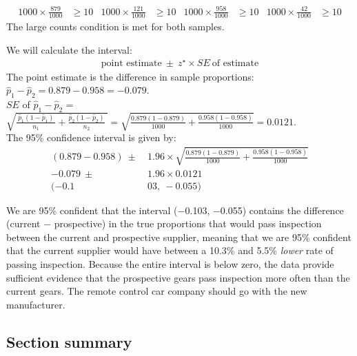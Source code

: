 \begin{examplewrap}
\begin{nexample}
\begin{description}
\begin{align*}
1000 \times \frac{879}{1000} &\ge 10
	&1000 \times \frac{121}{1000} &\ge 10
	&1000 \times \frac{958}{1000} &\ge 10
	&1000 \times \frac{42}{1000} &\ge 10
\end{align*}
The large counts condition is met for both samples.
\item[\inferencestep{Calculate}]  We will calculate the interval: 
\begin{align*}
\text{point estimate}\ \pm\ z^{\star} \times SE\ \text{of estimate}
\end{align*}
The point estimate is the difference in sample proportions: $\hat{p}_1-\hat{p}_2 = 0.879 - 0.958 = -0.079$.  \\

$SE$ of $\hat{p}_1-\hat{p}_2$ = $\sqrt{\frac{\ \hat{p}_1(1-\hat{p}_1)\ }{n_1}+ \frac{\hat{p}_2(1-\hat{p}_2)}{n_2}\ } = \sqrt{\frac{0.879(1-0.879)}{1000} +\frac{0.958(1-0.958)}{1000}}= 0.0121$.  \\

The 95\% confidence interval is given by:
\begin{align*}
(0.879 - 0.958) \ \pm \ &1.96 \times  \sqrt{\frac{0.879(1-0.879)}{1000} +\frac{0.958(1-0.958)}{1000}}\\
-0.079\ \pm\ &1.96 \times 0.0121 \\
(-0.1&03,\ -0.055)
\end{align*}

\item[\inferencestep{Conclude}]  We are 95\% confident that the interval ($-$0.103, $-$0.055) contains the difference (current $-$ prospective) in the true proportions that would pass inspection between the current and prospective supplier, meaning that we are 95\% confident that the current supplier would have between a 10.3\% and 5.5\% \emph{lower} rate of passing inspection.  Because the entire interval is below zero, the data provide sufficient evidence that the prospective gears pass inspection more often than the current gears. The remote control car company should go with the new manufacturer.
\end{description}
\end{nexample}
\end{examplewrap}




\D{\newpage}

\subsection*{Section summary}

